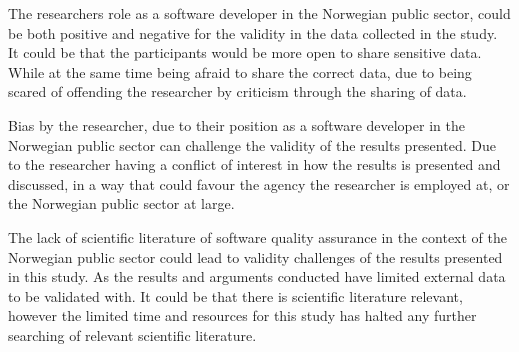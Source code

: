 The researchers role as a software developer in the Norwegian public sector, could be both positive and negative for the validity in the data collected in the study. It could be that the participants would be more open to share sensitive data. While at the same time being afraid to share the correct data, due to being scared of offending the researcher by criticism through the sharing of data.

Bias by the researcher, due to their position as a software developer in the Norwegian public sector can challenge the validity of the results presented. Due to the researcher having a conflict of interest in how the results is presented and discussed, in a way that could favour the agency the researcher is employed at, or the Norwegian public sector at large.

The lack of scientific literature of software quality assurance in the context of the Norwegian public sector could lead to validity challenges of the results presented in this study. As the results and arguments conducted have limited external data to be validated with. It could be that there is scientific literature relevant, however the limited time and resources for this study has halted any further searching of relevant scientific literature.




